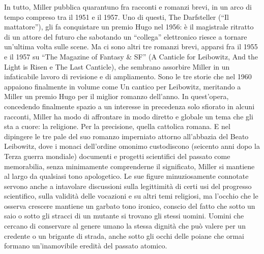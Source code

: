 In tutto, Miller pubblica quarantuno fra racconti e romanzi brevi, in un arco di tempo compreso tra il 1951 e il 1957. Uno di questi, The Darfsteller (“Il mattatore”), gli fa conquistare un premio Hugo nel 1956: è il magistrale ritratto di un attore del futuro che sabotando un “collega” elettronico riesce a tornare un'ultima volta sulle scene. Ma ci sono altri tre romanzi brevi, apparsi fra il 1955 e il 1957 su “The Magazine of Fantasy \& SF” (A Canticle for Leibowitz, And the Light is Risen e The Last Canticle), che sembrano assorbire Miller in un infaticabile lavoro di revisione e di ampliamento. Sono le tre storie che nel 1960 appaiono finalmente in volume come Un cantico per Leibowitz, meritando a Miller un premio Hugo per il miglior romanzo dell'anno. In quest'opera, concedendo finalmente spazio a un interesse in precedenza solo sfiorato in alcuni racconti, Miller ha modo di affrontare in modo diretto e globale un tema che gli sta a cuore: la religione. Per la precisione, quella cattolica romana. E nel dipingere le tre pale del suo romanzo imperniato attorno all'abbazia del Beato Leibowitz, dove i monaci dell'ordine omonimo custodiscono (seicento anni dopo la Terza guerra mondiale) documenti e progetti scientifici del passato come memorabilia, senza minimamente comprenderne il significato, Miller si mantiene al largo da qualsiasi tono apologetico. Le sue figure minuziosamente connotate servono anche a intavolare discussioni sulla legittimità di certi usi del progresso scientifico, sulla validità delle vocazioni e su altri temi religiosi, ma l'occhio che le osserva crescere mantiene un garbato tono ironico, conscio del fatto che sotto un saio o sotto gli stracci di un mutante si trovano gli stessi uomini. Uomini che cercano di conservare al genere umano la stessa dignità che può valere per un credente o un brigante di strada, anche sotto gli occhi delle poiane che ormai formano un'inamovibile eredità del passato atomico.